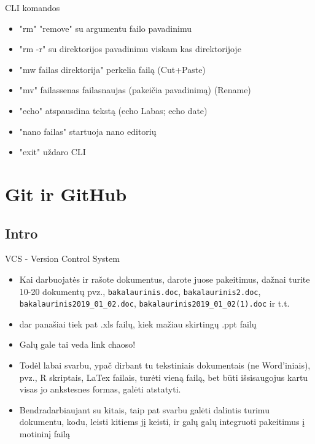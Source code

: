 \documentclass[11pt,xcolor=table]{beamer}
\begin{document}
\begin{frame}{CLI komandos}
\begin{itemize}
\item "rm" "remove" su argumentu failo pavadinimu
\item "rm -r" su direktorijos pavadinimu viskam kas direktorijoje
\item "mw failas direktorija" perkelia failą (Cut+Paste)
\item "mv" failassenas failasnaujas (pakeičia pavadinimą) (Rename)
\item "echo" atspausdina tekstą (echo Labas; echo date)
\item "nano failas" startuoja nano editorių 
\item "exit" uždaro CLI 
\end{itemize}
\end{frame}

\section{Git ir GitHub}

\subsection{Intro}
\begin{frame}{VCS - Version Control System}
\begin{itemize}
\item Kai darbuojatės ir rašote dokumentus, darote juose pakeitimus, dažnai turite 10-20 dokumentų pvz., \colorbox{listinggray}{\lstinline|bakalaurinis.doc|}, \colorbox{listinggray}{\lstinline|bakalaurinis2.doc|}, \colorbox{listinggray}{\lstinline|bakalaurinis2019_01_02.doc|}, \colorbox{listinggray}{\lstinline|bakalaurinis2019_01_02(1).doc|} ir t.t. 
\item dar panašiai tiek pat .xls failų, kiek mažiau skirtingų .ppt failų
\item Galų gale tai veda link chaoso!
\item Todėl labai svarbu, ypač dirbant tu tekstiniais dokumentais (ne Word'iniais), pvz., R skriptais, LaTex failais, turėti vieną failą, bet būti išsisaugojus kartu visas jo ankstesnes formas, galėti atstatyti.
\item Bendradarbiaujant su kitais, taip pat svarbu galėti dalintis turimu dokumentu, kodu, leisti kitiems jį keisti, ir galų galų integruoti pakeitimus į motininį failą
\end{itemize}
\end{frame}
\end{document}
